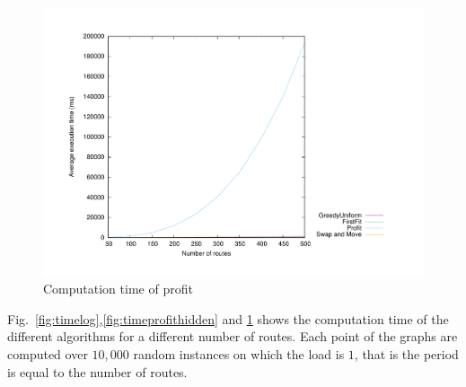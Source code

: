 \documentclass[a4paper,cleveref, autoref, thm-restate,UKenglish]{lipics-v2019}
\begin{document}
\begin{figure}
 \begin{center}
\includegraphics[scale=0.275]{profitshow}
\end{center}
\caption{Computation time of profit}
\label{fig:timeprofitshow}
\end{figure}

Fig.~\ref{fig:timelog},\ref{fig:timeprofithidden} and \ref{fig:timeprofitshow} shows the computation time of the different algorithms for a different number of routes. Each point of the graphs are computed over $10,000$ random instances on which the load is $1$, that is the period is equal to the number of routes.
 
\end{document}
